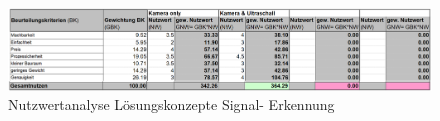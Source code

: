 \documentclass[../../main.tex]{subfiles}
\begin{document}
    \begin{figure}[H]
        \centering
        \includegraphics[width=1\textwidth]{Nutzwert_Signal.png}
        \caption{Nutzwertanalyse Lösungskonzepte Signal- Erkennung}
        \label{fig:nutzwer_signal}
    \end{figure}
\end{document}
